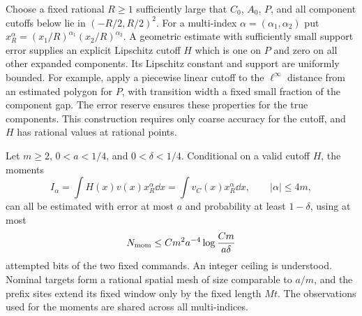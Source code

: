 Choose a fixed rational $R\ge1$ sufficiently large that $C_0$, $A_0$,
$P$, and all component cutoffs below lie in $(-R/2,R/2)^2$.
For a multi-index $\alpha=(\alpha_1,\alpha_2)$ put
$x_R^\alpha=(x_1/R)^{\alpha_1}(x_2/R)^{\alpha_2}$.
A geometric estimate with sufficiently small support error supplies
an explicit Lipschitz cutoff $H$ which is one on $P$ and zero on
all other expanded components.  Its Lipschitz constant and support
are uniformly bounded.  For example, apply a piecewise linear
cutoff to the $\ell^\infty$ distance from an estimated polygon for
$P$, with transition width a fixed small fraction of the component
gap.  The error reserve ensures these properties for the true
components.  This construction requires only coarse accuracy for
the cutoff, and $H$ has rational values at rational points.

\begin{lemma}
\label{lem:two-field-finite-moments}
Let $m\ge2$, $0<a<1/4$, and $0<\delta<1/4$.  Conditional on a
valid cutoff $H$, the moments
\[
 I_\alpha=\int H(x)v(x)x_R^\alpha\dd x
          =\int v_C(x)x_R^\alpha\dd x,
                    \qquad |\alpha|\le4m,
\]
can all be estimated with error at most $a$ and probability at least
$1-\delta$, using at most
\begin{equation}\label{eq:two-field-moment-cost}
 N_{\rm mom}\le C m^2a^{-4}
                    \log\frac{Cm}{a\delta}
\end{equation}
attempted bits of the two fixed commands.  An integer ceiling is
understood.  Nominal targets form a rational spatial mesh of size
comparable to $a/m$, and the prefix sites extend its fixed window
only by the fixed length $Mt$.  The observations used for the
moments are shared across all multi-indices.
\end{lemma}
